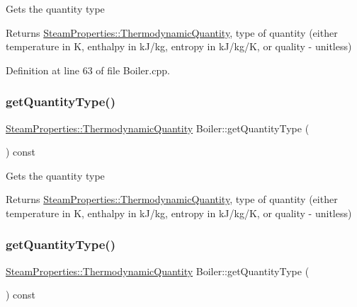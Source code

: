 Gets the quantity type \begin{DoxyReturn}{Returns}
\hyperlink{class_steam_properties_ae0294bedf7d178c2d8fb6aed0f62fbff}{Steam\+Properties\+::\+Thermodynamic\+Quantity}, type of quantity (either temperature in K, enthalpy in k\+J/kg, entropy in k\+J/kg/K, or quality -\/ unitless) 
\end{DoxyReturn}


Definition at line 63 of file Boiler.\+cpp.

\mbox{\label{class_boiler_a26a71f789c9f9e05bd43a1ca0219f920}} 
\subsubsection{\texorpdfstring{get\+Quantity\+Type()}{getQuantityType()}\hspace{0.1cm}{\footnotesize\ttfamily [2/3]}}
{\footnotesize\ttfamily \hyperlink{class_steam_properties_ae0294bedf7d178c2d8fb6aed0f62fbff}{Steam\+Properties\+::\+Thermodynamic\+Quantity} Boiler\+::get\+Quantity\+Type (\begin{DoxyParamCaption}{ }\end{DoxyParamCaption}) const}

Gets the quantity type \begin{DoxyReturn}{Returns}
\hyperlink{class_steam_properties_ae0294bedf7d178c2d8fb6aed0f62fbff}{Steam\+Properties\+::\+Thermodynamic\+Quantity}, type of quantity (either temperature in K, enthalpy in k\+J/kg, entropy in k\+J/kg/K, or quality -\/ unitless) 
\end{DoxyReturn}
\mbox{\label{class_boiler_a26a71f789c9f9e05bd43a1ca0219f920}} 
\subsubsection{\texorpdfstring{get\+Quantity\+Type()}{getQuantityType()}\hspace{0.1cm}{\footnotesize\ttfamily [3/3]}}
{\footnotesize\ttfamily \hyperlink{class_steam_properties_ae0294bedf7d178c2d8fb6aed0f62fbff}{Steam\+Properties\+::\+Thermodynamic\+Quantity} Boiler\+::get\+Quantity\+Type (\begin{DoxyParamCaption}{ }\end{DoxyParamCaption}) const}


